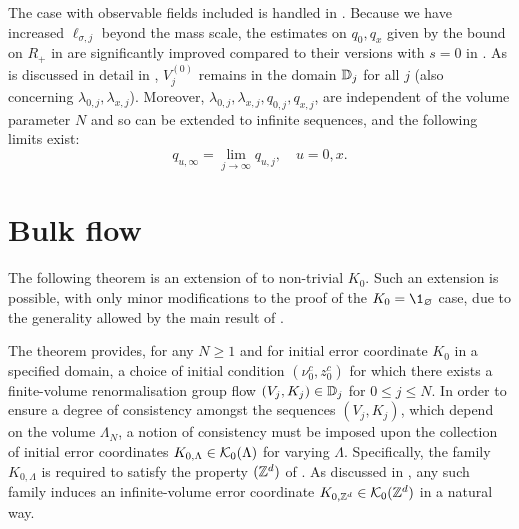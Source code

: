 The case with observable fields included is handled in \cite{ST-phi4}.
Because we have increased $\ell_{\sigma,j}$ beyond the mass scale, the
estimates on $q_0,q_x$ given by the bound on $R_+$ in  are
significantly improved compared to their versions with $s=0$ in \cite{ST-phi4}.
As is discussed in detail in  \cite[Section~\ref{phi4-sec:pfmr1}]{ST-phi4},
$V_j^{(0)}$ remains in the domain $\mathbb{D}_j$ for all $j$
(also concerning $\lambda_{0,j}, \lambda_{x,j}$).
Moreover,
$\lambda_{0,j}, \lambda_{x,j},q_{0,j},q_{x,j}$, are independent of the volume parameter $N$ and
so can be extended to infinite sequences, and the following limits exist:
\begin{equation}
q_{u,\infty} = \lim_{j\to\infty} q_{u,j}, \quad u = 0, x.
\end{equation}

\section{Bulk flow}
\label{sec:flow}

The following theorem is an extension of \cite[Proposition~\ref{log-prop:flow-flow}]{BBS-saw4-log}
to non-trivial $K_0$. Such an extension is possible,
with only minor modifications to the proof of the $K_0 = \1_\varnothing$ case,
due to the generality allowed by the main result of \cite{BBS-rg-flow}.


The theorem provides, for any $N \ge 1$ and for initial error coordinate $K_0$
in a specified domain, a choice of initial condition $(\nu_0^c,z_0^c)$
for which there exists
a finite-volume renormalisation group flow $(V_j, K_j) \in \mathbb{D}_j$ for $0 \le j \le N$.
In order to ensure a degree of consistency amongst the sequences $(V_j, K_j)$, which depend on
the volume $\Lambda_N$, a notion of consistency must be imposed upon the collection of initial
error coordinates $K_{0,\Lambda} \in \mathcal{K}_0(\Lambda)$ for varying $\Lambda$.
Specifically, the family $K_{0,\Lambda}$ is required to satisfy the property $({ {{\mathbb Z}}^d })$ of
\cite[Definition~\ref{step-defn:KZd}]{BS-rg-step}. As discussed in
\cite[Definition~\ref{step-defn:KZd}]{BS-rg-step},
any such family induces an infinite-volume error
coordinate $K_{0,{ {{\mathbb Z}}^d }} \in \mathcal{K}_0({ {{\mathbb Z}}^d })$ in a natural way.

